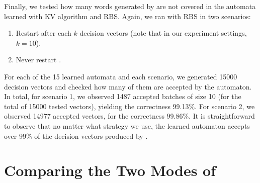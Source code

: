 Finally, we tested how many words generated by \CREST are not covered in the automata learned with KV algorithm and RBS. Again, we ran \CREST with RBS in two scenarios: 
\begin{enumerate}
	\item Restart \CREST after each $k$ decision vectors (note that in our experiment settings, $k = 10$).
	\item Never restart \CREST.
\end{enumerate}
For each of the 15 learned automata and each scenario, we generated 15000 decision vectors and checked how many of them are accepted by the automaton. In total, for scenario 1, we observed 1487 accepted batches of size 10 (for the total of 15000 tested vectors), yielding the correctness 99.13\%. For scenario 2, we observed 14977 accepted vectors, for the correctness 99.86\%. It is straightforward to observe that no matter what strategy we use, the learned automaton accepts over 99\% of the decision vectors produced by \CREST. 

\section{Comparing the Two Modes of \PACMAN}\label{sec:compare_learning_sampling}
 
